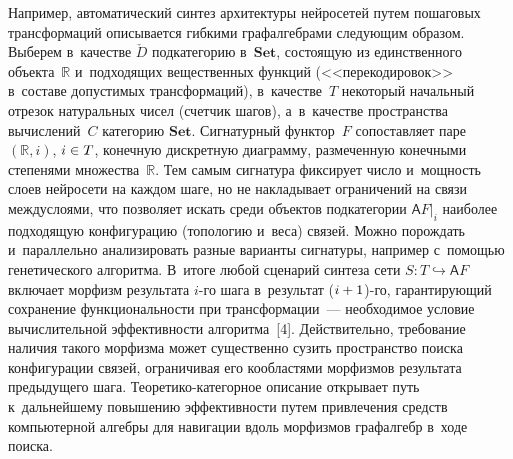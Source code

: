 \begin{multicols}{2}
     Например, автоматический синтез архитектуры нейросетей путем 
пошаговых трансформаций описывается гибкими графалгебрами сле\-ду\-ющим 
образом. Выберем в~качестве $\check{D}$ подкатегорию в~$\mathbf{Set}$, 
состоящую из единственного объекта~$\mathbb{R}$ и~под\-хо\-дя\-щих 
вещественных функций (<<перекодировок>> в~составе до\-пус\-ти\-мых 
трансформаций), в~качестве~$T$ некоторый начальный отрезок натуральных 
чисел (счетчик шагов), а~в~качестве пространства вы\-чис\-ле\-ний~$C$ категорию 
$\mathbf{Set}$. Сигнатурный функтор~$F$ сопоставляет паре $(\mathbb{R}, 
i)$, $i \hm\in T$, конечную дискретную диаграмму, размеченную конечными 
степенями множества~$\mathbb{R}$. Тем самым сигнатура фиксирует чис\-ло 
и~мощность слоев нейросети на каждом шаге, но не накладывает ограничений 
на связи между\linebreak слоями, что поз\-во\-ля\-ет искать среди объектов подкатегории 
$\mathsf {A}F\vert_i$ наиболее подходящую конфигурацию (топологию и~веса) 
связей. Можно по\-рож\-дать и~параллельно анализировать разные \mbox{варианты} 
сигнатуры, например с~по\-мощью генетического алгоритма. В~итоге любой 
сценарий синтеза сети $S : T \hookrightarrow \mathsf {A}F$ включает морфизм 
результата $i$-го шага в~результат ($i \hm+ 1$)-го, га\-ран\-ти\-ру\-ющий сохранение 
функ\-ци\-о\-наль\-ности при трансформации~--- необходимое условие 
вы\-чис\-ли\-тель\-ной эф\-фек\-тив\-ности алгоритма~[4]. Действительно, требование 
наличия такого морфизма может существенно \mbox{сузить} пространство поиска 
конфигурации связей, ограничивая его кообластями морфизмов результата 
предыду\-ще\-го шага. Тео\-ре\-ти\-ко-ка\-те\-гор\-ное описание открывает путь 
к~дальнейшему повышению эффективности путем привлечения средств 
компьютерной алгебры для навигации вдоль морфизмов графалгебр в~ходе 
поиска.
     

\end{multicols}
